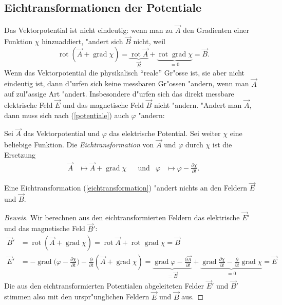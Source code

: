 \subsection{Eichtransformationen der Potentiale}
Das Vektorpotential ist nicht eindeutig: wenn man zu $\vec A$
den Gradienten einer Funktion $\chi$ hinzuaddiert, "andert sich
$\vec B$ nicht, weil
\[
\operatorname{rot}(\vec A+\operatorname{grad}\chi)
=
\underbrace{\operatorname{rot}\vec A}_{\vec B}
+
\underbrace{\operatorname{rot}\operatorname{grad}\chi}_{=0}
=
\vec B.
\]
Wenn das Vektorpotential die physikalisch ``reale'' Gr"osse ist,
sie aber nicht eindeutig ist, dann d"urfen sich keine messbaren
Gr"ossen "andern, wenn man $\vec A$ auf zul"assige Art "andert.
Insbesondere d"urfen sich das direkt messbare elektrische Feld
$\vec E$ und das magnetische Feld $\vec B$ nicht "andern.
"Andert man $\vec A$, dann muss sich nach (\ref{potentiale})
auch $\varphi$ "andern:

\begin{definition}
Sei $\vec A$ das Vektorpotential und $\varphi$ das elektrische
Potential. Sei weiter $\chi$ eine beliebige Funktion.
Die {\em Eichtransformation} von $\vec A$ und $\varphi$ durch $\chi$ ist
die Ersetzung
\begin{equation}
\begin{aligned}
\vec A&\mapsto \vec A + \operatorname{grad}\chi
&&\text{und}&
\varphi&\mapsto \varphi-\frac{\partial\chi}{\partial t}.
\end{aligned}
\label{eichtransformation}
\end{equation}
\end{definition}

\begin{satz}
Eine Eichtransformation (\ref{eichtransformation}) "andert nichts an den
Feldern $\vec E$ und $\vec B$.
\end{satz}

\begin{proof}[Beweis]
Wir berechnen aus den eichtransformierten Feldern das elektrische 
 $\vec E'$ und das magnetische Feld $\vec B'$:
\begin{align*}
\vec B'
&=
\operatorname{rot}(\vec A+\operatorname{grad}\chi)
=
\operatorname{rot}\vec A+\operatorname{rot}\operatorname{grad}\chi
=
\vec B
\\
\vec E'
&=
-\operatorname{grad}\biggl(\varphi -\frac{\partial\chi}{\partial t}\biggr)
-\frac{\partial}{\partial t}(\vec A+\operatorname{grad}\chi)
=
\underbrace{
\operatorname{grad}\varphi-\frac{\partial\vec A}{\partial t}
}_{=\vec B}
+
\underbrace{
\operatorname{grad}\frac{\partial\chi}{\partial t}
-\frac{\partial}{\partial t}\operatorname{grad}\chi
}_{=0}
=
\vec E
\end{align*}
Die aus den eichtransformierten Potentialen abgeleiteten Felder $\vec E'$
und $\vec B'$ stimmen also mit den urspr"unglichen Feldern $\vec E$
und $\vec B$ aus.
\end{proof}

